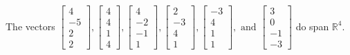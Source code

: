 \begin{exercise}
\begin{exerciseStatement}
  \end{exerciseStatement}
  \begin{exerciseAnswer}
   The vectors \(\left[\begin{array}{r}
4 \\
-5 \\
2 \\
2
\end{array}\right] , \left[\begin{array}{r}
4 \\
4 \\
1 \\
4
\end{array}\right] , \left[\begin{array}{r}
4 \\
-2 \\
-1 \\
1
\end{array}\right] , \left[\begin{array}{r}
2 \\
-3 \\
4 \\
1
\end{array}\right] , \left[\begin{array}{r}
-3 \\
4 \\
1 \\
1
\end{array}\right] , \text{ and } \left[\begin{array}{r}
3 \\
0 \\
-1 \\
-3
\end{array}\right]\) 
  	 do  
	span \(\mathbb{R}^4\).
  


  \end{exerciseAnswer}
\end{exercise}